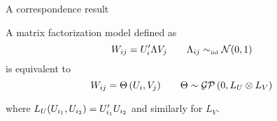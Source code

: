 \begin{frame}{A correspondence result}
  \begin{block}{}
\begin{prop}
\label{prop:matrixfactorisation}
A matrix factorization model defined as
\begin{equation*}
W_{ij} = U_i'\Lambda V_j \quad \quad \Lambda_{ij} \sim_{\mbox{\tiny iid}} \mathcal{N} (0, 1)
\end{equation*}
is equivalent to
\begin{equation*}
W_{ij} = \Theta\,(U_i, V_j) \quad \quad \Theta \sim \mathcal{GP}\,(0, L_U \otimes L_V)
\end{equation*}
\vspace{\baselineskip}

where $L_U(U_{i_1}, U_{i_2}) = U_{i_1}'U_{i_2}$ and similarly for $L_V$.
\end{prop}
  \end{block}
\end{frame}

